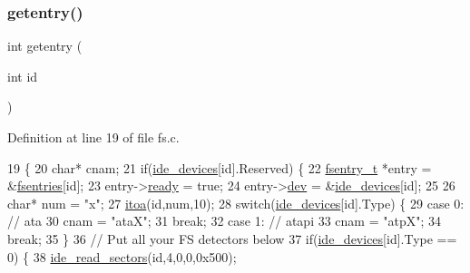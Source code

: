 \subsubsection{\texorpdfstring{getentry()}{getentry()}}
{\footnotesize\ttfamily int getentry (\begin{DoxyParamCaption}\item[{int}]{id }\end{DoxyParamCaption})}



Definition at line 19 of file fs.\+c.


\begin{DoxyCode}
19                      \{
20     \textcolor{keywordtype}{char}* cnam;
21     \textcolor{keywordflow}{if}(\hyperlink{a00035_ab97a828ed4839b575dc382e2bf826e87_ab97a828ed4839b575dc382e2bf826e87}{ide\_devices}[\textcolor{keywordtype}{id}].Reserved) \{
22         \hyperlink{a00272}{fsentry\_t} *entry = &\hyperlink{a00152_a6b46131164b26e476762930c9aae4319_a6b46131164b26e476762930c9aae4319}{fsentries}[id];
23         entry->\hyperlink{a00272_a284522ed97fe1eeebd0fcc039b2ea00a_a284522ed97fe1eeebd0fcc039b2ea00a}{ready} = \textcolor{keyword}{true};
24         entry->\hyperlink{a00272_aaea66ea744fa50f1c54666033884d8d2_aaea66ea744fa50f1c54666033884d8d2}{dev} = &\hyperlink{a00035_ab97a828ed4839b575dc382e2bf826e87_ab97a828ed4839b575dc382e2bf826e87}{ide\_devices}[id];
25         
26         \textcolor{keywordtype}{char}* num = \textcolor{stringliteral}{"x"};
27         \hyperlink{a00125_ab42640268f26e065efd044cfe80591bd_ab42640268f26e065efd044cfe80591bd}{itoa}(\textcolor{keywordtype}{id},num,10);
28         \textcolor{keywordflow}{switch}(\hyperlink{a00035_ab97a828ed4839b575dc382e2bf826e87_ab97a828ed4839b575dc382e2bf826e87}{ide\_devices}[\textcolor{keywordtype}{id}].Type) \{
29             \textcolor{keywordflow}{case} 0: \textcolor{comment}{// ata}
30                 cnam = \textcolor{stringliteral}{"ataX"};
31                 \textcolor{keywordflow}{break};
32             \textcolor{keywordflow}{case} 1: \textcolor{comment}{// atapi}
33                 cnam = \textcolor{stringliteral}{"atpX"};
34                 \textcolor{keywordflow}{break};
35         \}
36         \textcolor{comment}{// Put all your FS detectors below}
37         \textcolor{keywordflow}{if}(\hyperlink{a00035_ab97a828ed4839b575dc382e2bf826e87_ab97a828ed4839b575dc382e2bf826e87}{ide\_devices}[\textcolor{keywordtype}{id}].Type == 0) \{
38             \hyperlink{a00032_a9dd84843412753d236e17a15277c5b98_a9dd84843412753d236e17a15277c5b98}{ide\_read\_sectors}(\textcolor{keywordtype}{id},4,0,0,0x500);

\end{DoxyCode}
